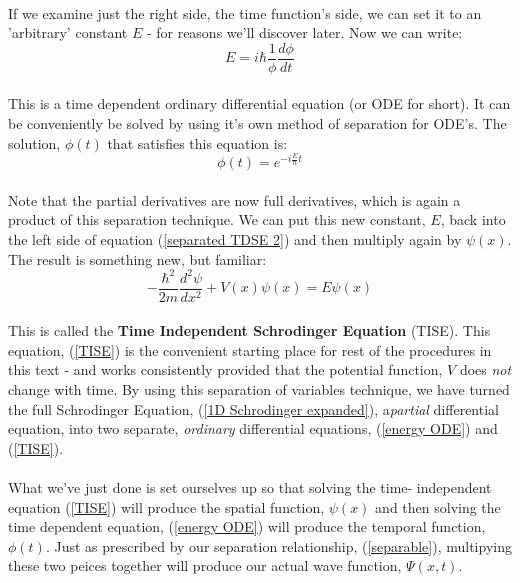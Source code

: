 \documentclass[12pt,letterpaper]{book}
\begin{document}
\paragraph*{}If we examine just the right side, the time function's side, we can set it to an 'arbitrary' constant $E$ - for reasons we'll discover later. Now we can write:
\begin{equation}
\label{energy ODE}
E = i\hbar \frac{1}{\phi}\frac{d\phi}{dt}
\end{equation}
\paragraph*{}This is a time dependent ordinary differential equation (or ODE for short). It can be conveniently be solved by using it's own method of separation for ODE's. The solution, $\phi(t)$ that satisfies this equation is:
\begin{equation}
\label{phi}
\phi(t) =  e^{-i\frac{E}{\hbar}t}
\end{equation}
\paragraph*{}Note that the partial derivatives are now full derivatives, which is again a product of this separation technique. We can put this new constant, $E$, back into the left side of equation (\ref{separated TDSE 2}) and then multiply again by $\psi(x)$. The result is something new, but familiar:
\begin{equation}
\label{TISE}
-\frac{\hbar^2}{2m}\frac{d^2\psi}{dx^2} + V(x)\psi(x) = E\psi(x)
\end{equation}
\paragraph*{}This is called the \textbf{Time Independent Schrodinger Equation} (TISE). This equation, (\ref{TISE}) is the convenient starting place for rest of the procedures in this text - and works consistently provided that the potential function, $V$ does \textit{not} change with time. By using this separation of variables technique, we have turned the full Schrodinger Equation, (\ref{1D Schrodinger expanded}), a\textit{partial} differential equation, into two separate, \textit{ordinary} differential equations, 
(\ref{energy ODE}) and  (\ref{TISE}). 
\paragraph*{}What we've just done is set ourselves up so that solving the time- independent equation (\ref{TISE}) will produce the spatial function, $\psi(x)$ and then solving the time dependent equation, (\ref{energy ODE}) will produce the temporal function, $\phi(t)$. Just as prescribed by our separation relationship, (\ref{separable}), multipying these two peices together will produce our actual wave function, $\Psi(x,t)$. 
\end{document}
